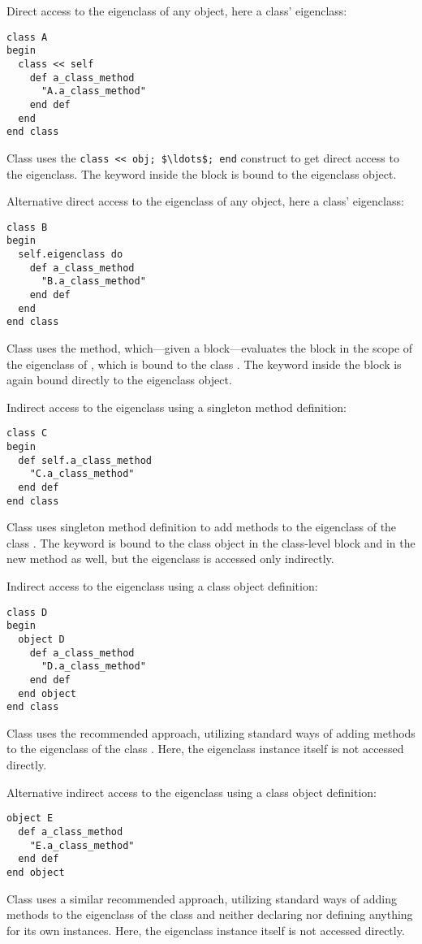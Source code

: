 \example Direct access to the eigenclass of any object, here a class' eigenclass:
\begin{lstlisting}
class A
begin
  class << self
    def a_class_method
      "A.a_class_method"
    end def
  end
end class
\end{lstlisting}
Class  uses the \lstinline!class << obj; $\ldots$; end! construct to get direct access to the eigenclass. The keyword  inside the block is bound to the eigenclass object. 

\example Alternative direct access to the eigenclass of any object, here a class' eigenclass:
\begin{lstlisting}
class B
begin
  self.eigenclass do
    def a_class_method
      "B.a_class_method"
    end def
  end
end class
\end{lstlisting}
Class  uses the  method, which---given a block---evaluates the block in the scope of the eigenclass of , which is bound to the class . The keyword  inside the block is again bound directly to the eigenclass object. 

\example Indirect access to the eigenclass using a singleton method definition:
\begin{lstlisting}
class C
begin
  def self.a_class_method
    "C.a_class_method"
  end def
end class
\end{lstlisting}
Class  uses singleton method definition to add methods to the eigenclass of the class . The keyword  is bound to the class object in the class-level block and in the new method as well, but the eigenclass is accessed only indirectly. 

\example Indirect access to the eigenclass using a class object definition:
\begin{lstlisting}
class D
begin
  object D
    def a_class_method
      "D.a_class_method"
    end def
  end object
end class
\end{lstlisting}
Class  uses the recommended approach, utilizing standard ways of adding methods to the eigenclass of the class . Here, the eigenclass instance itself is not accessed directly.  

\example Alternative indirect access to the eigenclass using a class object definition:
\begin{lstlisting}
object E
  def a_class_method
    "E.a_class_method"
  end def
end object
\end{lstlisting}
Class  uses a similar recommended approach, utilizing standard ways of adding methods to the eigenclass of the class  and neither declaring nor defining anything for its own instances. Here, the eigenclass instance itself is not accessed directly. 






